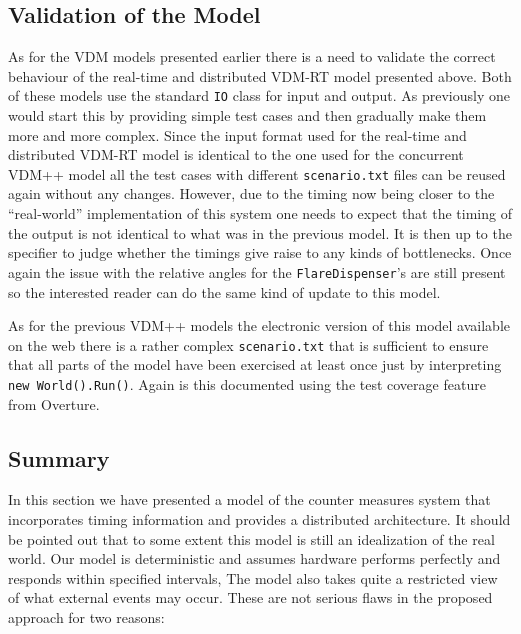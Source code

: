\documentclass{overturerepchap}
\begin{document}




\subsection{Validation of the Model}

As for the VDM models presented earlier there is a need to
validate the correct behaviour of the real-time and distributed 
VDM-RT model presented
above. Both of these models use the standard
\texttt{IO} class for input and output. As previously one would start 
this by providing simple test cases and then gradually make them more
and more complex. Since the input format used for the real-time and
distributed VDM-RT model is identical to the one used for the
concurrent VDM++ model all the test cases with different
\texttt{scenario.txt} files can be reused again without any changes.
However, due to the timing now being closer to the ``real-world''
implementation of this system one needs to expect that the timing of
the output is not identical to what was in the previous model. It is
then up to the specifier to judge whether the timings give raise to
any kinds of bottlenecks. Once again the issue with the relative
angles for the
\texttt{FlareDispenser}'s are still present so the interested reader
can do the same kind of update to this model.

As for the previous VDM++ models the electronic
version of this model available on the web there is a rather complex 
\texttt{scenario.txt} that is sufficient to ensure that all parts of the
model have been exercised at least once just by interpreting
\texttt{new World().Run()}. Again is this documented using the test
coverage feature from Overture.

\subsection{Summary}

In this section we have presented a model of the counter measures
system that incorporates timing information and provides a distributed
architecture. It should be pointed out that to some extent this model
is still an idealization of the real world. Our model is deterministic and
assumes hardware performs perfectly and responds within specified
intervals, The model also takes quite a restricted view of what
external events may occur. These are not serious flaws in the proposed
approach for two reasons:
\end{document}
